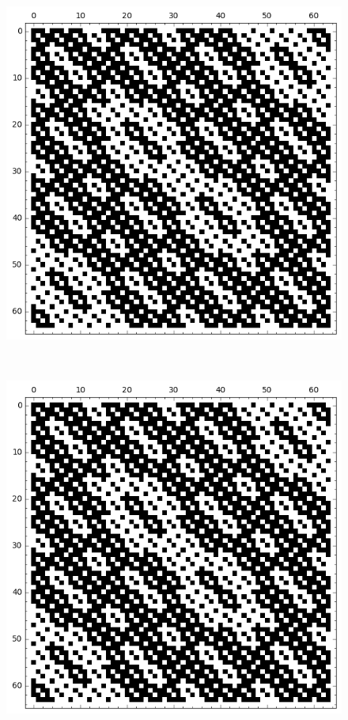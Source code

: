 \documentclass[12pt,a4paper]{article}
\begin{document}

\begin{figure}[!bhpt] %
\centering
\begin{minipage}{.48\textwidth}
  \centering
  \includegraphics[width=.9\linewidth]{../matrix_plot/re6_1_weight_class_matrix.png}
  \label{fig:6_1_weight_class_matrix}
\end{minipage}%
~~~~
\begin{minipage}{.48\textwidth}
  \centering
  \includegraphics[width=.9\linewidth]{../matrix_plot/re6_1_bent_cayley_graph_index_matrix.png}
  \label{fig:6_1_bent_cayley_graph_index_matrix}
\end{minipage}
\end{figure}
\end{document}
